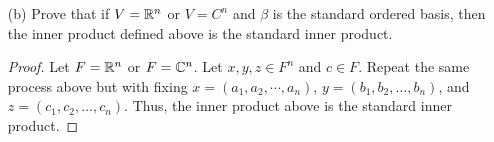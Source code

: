 \begin{enumerate}
\begin{proof}
\begin{enumerate}
\begin{align*}
                    \langle cx ,  y  \rangle = \sum_{ i=1  }^{ n } c {a}_{i} \overline{{b}_{i}} 
                                             = c \sum_{ i=1  }^{ n } {a}_{i} \overline{{b}_{i}} 
                                             =  c \langle x , y \rangle.
                \end{align*}
                Thus, part (b) is satisfied.
            \item[(c)] 
                \begin{align*}
                   \overline{\langle x , y \rangle} = \overline{\sum_{ i=1 }^{ n } {a}_{i} \overline{{b}_{i}}} 
                                                    = \sum_{ i=1  }^{ n } \overline{{a}_{i} \overline{{b}_{i}}} 
                                                    &= \sum_{ i=1  }^{ n } \overline{{a}_{i}} {b}_{i} \tag{\( \overline{\overline{{b}_{i}}} = {b}_{i} \)} \\
                                                    &= \sum_{ i=1  }^{ n } {b}_{i} \overline{{a}_{i}}   \\
                                                    &= \langle y , x \rangle.
                \end{align*}
                Thus, part (d) is satisfied.
            \item[(d)] Suppose \( x \neq 0  \). Then by definition of \( \langle \cdot  ,  \cdot \rangle \), we must have
                \[  \langle x , x \rangle = \sum_{ i=1  }^{ n } {a}_{i} \overline{{a}_{i}} = \sum_{ i=1  }^{ n } | {a}_{i} |^{2} > 0.  \]
                Thus, part (d) is satisfied.
\end{enumerate}
        \end{proof}
    \item[(b)] Prove that if \( V = \mathbb{R}^{n}  \) or \( V = C^{n} \) and \( \beta  \) is the standard ordered basis, then the inner product defined above is the standard inner product.
        \begin{proof}
        Let \( F = \mathbb{R}^{n}  \) or \( F = \mathbb{C}^{n} \). Let \( x,y,z \in F^{n} \) and \( c \in F  \). Repeat the same process above but with fixing \( x = ({a}_{1}, {a}_{2}, \cdots, {a}_{n}) \), \( y = ({b}_{1}, {b}_{2}, \dots, {b}_{n})  \), and \( z = ({c}_{1}, {c}_{2}, \dots, {c}_{n}) \). Thus, the inner product above is the standard inner product.
        \end{proof}
\end{enumerate}

